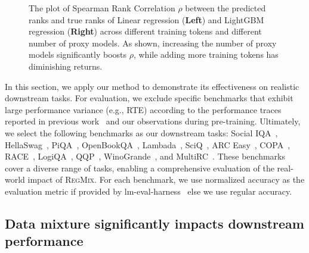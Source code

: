 \documentclass{article}
\theoremstyle{definition}
\theoremstyle{remark}
\newcommand{\ourmethod}{\textsc{RegMix}\xspace}
\begin{document}
\begin{figure}[!t]
\vspace{-3mm}
\caption{The plot of Spearman Rank Correlation $\rho$ between the predicted ranks and true ranks of Linear regression (\textbf{Left}) and LightGBM regression (\textbf{Right}) across different training tokens and different number of proxy models. As shown, increasing the number of proxy models significantly boosts $\rho$, while adding more training tokens has diminishing returns. 
}
\label{fig:1M-to-Test}
\vspace{-2mm}
\end{figure}

In this section, we apply our method to demonstrate its effectiveness on realistic downstream tasks. For evaluation, we exclude specific benchmarks that exhibit large performance variance (e.g., RTE) according to the performance traces reported in previous work~\citep{openelm2024} and our observations during pre-training.
Ultimately, we select the following benchmarks as our downstream tasks: Social IQA~\citep{sap2019socialiqa}, HellaSwag~\citep{zellers2019hellaswag}, PiQA~\citep{bisk2020piqa}, OpenBookQA~\citep{mihaylov2018can}, Lambada~\citep{paperno2016lambada}, SciQ~\citep{welbl2017crowdsourcing}, ARC Easy~\citep{clark2018think}, COPA~\citep{sarlin2020superglue}, RACE~\citep{lai2017race}, LogiQA~\citep{liu2020logiqa}, QQP~\citep{wang2018glue}, WinoGrande~\citep{sakaguchi2021winogrande}, and MultiRC~\citep{khashabi2018looking}. These benchmarks cover a diverse range of tasks, enabling a comprehensive evaluation of the real-world impact of \ourmethod. For each benchmark, we use normalized accuracy as the evaluation metric if provided by lm-eval-harness~\citep{eval-harness} else we use regular accuracy.

\subsection{Data mixture significantly impacts downstream performance}
\end{document}
